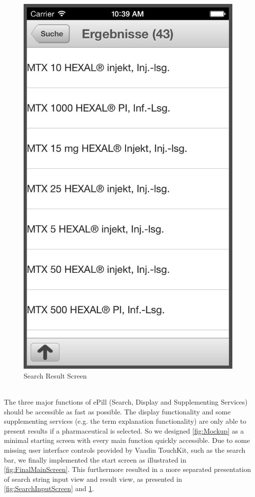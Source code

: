 \begin{figure}[ptbh]
\begin{minipage}[b]{0.45\linewidth}
        \includegraphics[width=0.8025\linewidth]{figures/Results_bw.jpg}
        \caption[Search Result Screen]{Search Result Screen}
        \label{fig:SearchResultScreen}
    \end{minipage}
\end{figure}
\\
The three major functions of ePill (Search, Display and Supplementing Services) should be accessible as fast as possible. The display functionality and some supplementing services (e.g. the term explanation functionality) are only able to present results if a pharmaceutical is selected. So we designed \ref{fig:Mockup} as a minimal starting screen with every main function quickly accessible. Due to some missing user interface controls provided by Vaadin TouchKit, such as the search bar, we finally implemented the start screen as illustrated in \ref{fig:FinalMainScreen}. This furthermore resulted in a more separated presentation of search string input view and result view, as presented in \ref{fig:SearchInputScreen} and \ref{fig:SearchResultScreen}.
